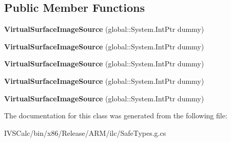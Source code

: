 \subsection*{Public Member Functions}
\begin{DoxyCompactItemize}
\item 
\mbox{\label{class_windows_1_1_u_i_1_1_xaml_1_1_media_1_1_imaging_1_1_virtual_surface_image_source_a6139a9cf6ab459e854762b5dd62ecbbd}} 
{\bfseries Virtual\+Surface\+Image\+Source} (global\+::\+System.\+Int\+Ptr dummy)
\item 
\mbox{\label{class_windows_1_1_u_i_1_1_xaml_1_1_media_1_1_imaging_1_1_virtual_surface_image_source_a6139a9cf6ab459e854762b5dd62ecbbd}} 
{\bfseries Virtual\+Surface\+Image\+Source} (global\+::\+System.\+Int\+Ptr dummy)
\item 
\mbox{\label{class_windows_1_1_u_i_1_1_xaml_1_1_media_1_1_imaging_1_1_virtual_surface_image_source_a6139a9cf6ab459e854762b5dd62ecbbd}} 
{\bfseries Virtual\+Surface\+Image\+Source} (global\+::\+System.\+Int\+Ptr dummy)
\item 
\mbox{\label{class_windows_1_1_u_i_1_1_xaml_1_1_media_1_1_imaging_1_1_virtual_surface_image_source_a6139a9cf6ab459e854762b5dd62ecbbd}} 
{\bfseries Virtual\+Surface\+Image\+Source} (global\+::\+System.\+Int\+Ptr dummy)
\item 
\mbox{\label{class_windows_1_1_u_i_1_1_xaml_1_1_media_1_1_imaging_1_1_virtual_surface_image_source_a6139a9cf6ab459e854762b5dd62ecbbd}} 
{\bfseries Virtual\+Surface\+Image\+Source} (global\+::\+System.\+Int\+Ptr dummy)
\end{DoxyCompactItemize}


The documentation for this class was generated from the following file\+:\begin{DoxyCompactItemize}
\item 
I\+V\+S\+Calc/bin/x86/\+Release/\+A\+R\+M/ilc/Safe\+Types.\+g.\+cs\end{DoxyCompactItemize}
